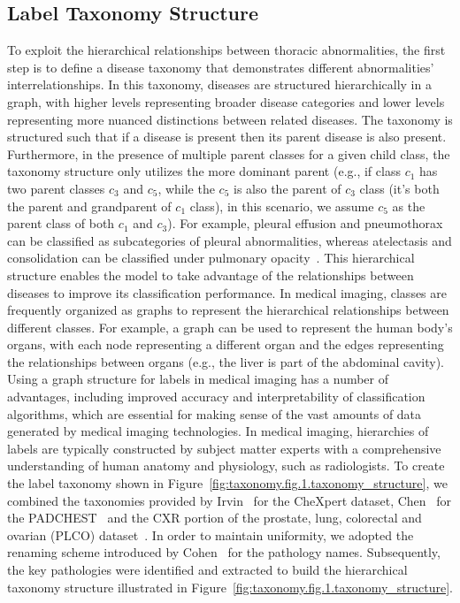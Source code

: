 \subsection{Label Taxonomy Structure}\label{subsec:label-taxonomy-and-hierarchy}
To exploit the hierarchical relationships between thoracic abnormalities, the first step is to define a disease taxonomy that demonstrates different abnormalities' interrelationships. In this taxonomy, diseases are structured hierarchically in a graph, with higher levels representing broader disease categories and lower levels representing more nuanced distinctions between related diseases. The taxonomy is structured such that if a disease is present then its parent disease is also present. Furthermore, in the presence of multiple parent classes for a given child class, the taxonomy structure only utilizes the more dominant parent (e.g., if class $c_1$ has two parent classes $c_3$ and $c_5$, while the $c_5$ is also the parent of $c_3$ class (it's both the parent and grandparent of $c_1$ class), in this scenario, we assume $c_5$ as the parent class of both $c_1$ and $c_3$).
%
For example, pleural effusion and pneumothorax can be classified as subcategories of pleural abnormalities, whereas atelectasis and consolidation can be classified under pulmonary opacity~\cite{irvin_CheXpert_2019}. This hierarchical structure enables the model to take advantage of the relationships between diseases to improve its classification performance.
In medical imaging, classes are frequently organized as graphs to represent the hierarchical relationships between different classes. For example, a graph can be used to represent the human body's organs, with each node representing a different organ and the edges representing the relationships between organs (e.g., the liver is part of the abdominal cavity). Using a graph structure for labels in medical imaging has a number of advantages, including improved accuracy and interpretability of classification algorithms, which are essential for making sense of the vast amounts of data generated by medical imaging technologies. In medical imaging, hierarchies of labels are typically constructed by subject matter experts with a comprehensive understanding of human anatomy and physiology, such as radiologists.
%
To create the label taxonomy shown in Figure~\ref{fig:taxonomy.fig.1.taxonomy_structure}, we combined the taxonomies provided by Irvin~\cite{irvin_CheXpert_2019} for the CheXpert dataset, Chen~\cite{chen_Deep_2020} for the PADCHEST~\cite{bustos_Padchest_2020} and the CXR portion of the prostate, lung, colorectal and ovarian (PLCO) dataset~\cite{gohagan_Prostate_2000}.
In order to maintain uniformity, we adopted the renaming scheme introduced by Cohen~\cite{cohen_TorchXRayVision_2022} for the pathology names. Subsequently, the key pathologies were identified and extracted to build the hierarchical taxonomy structure illustrated in Figure~\ref{fig:taxonomy.fig.1.taxonomy_structure}.
%
